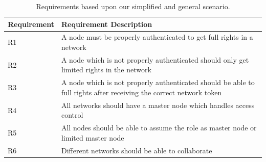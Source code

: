\begin{table}[ht!]
	\centering
	\begin{tabular}{ | l | p{11cm} | }
	\hline
	\textbf{Requirement} & \textbf{Requirement Description}\\ \hline
		R1 & A node must be properly authenticated to get full rights in a network  \\ \hline
		R2 & A node which is not properly authenticated should only get limited rights in the network  \\ \hline		
		R3 & A node which is not properly authenticated should be able to full rights after receiving the correct network token \\ \hline
		R4 & All networks should have a master node which handles access control \\ \hline
		R5 & All nodes should be able to assume the role as master node or limited master node \\ \hline
		R6 & Different networks should be able to collaborate \\ \hline
	\end{tabular}
	\caption{Requirements based upon our simplified and general scenario.}
	\label{tab:our_req}
\end{table}

